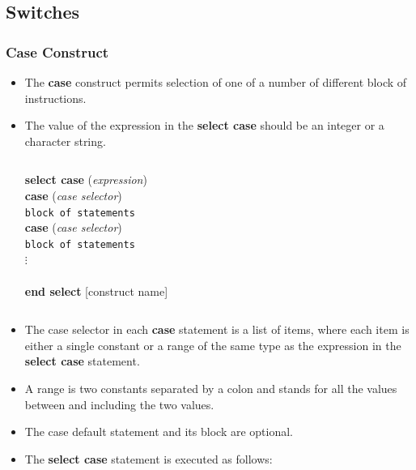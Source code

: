 \documentclass[slidestop,mathserif,compress,xcolor=svgnames]{beamer}
\begin{document}
\subsection{Switches}
\begin{frame}
  \frametitle{\small Case Construct}
  \begin{itemize}
    \item The \textbf{case} construct permits selection of one of a number of different block of instructions.
    \item The value of the expression in the \textbf{select case} should be an integer or a character string.
  \begin{columns}
    \column{5cm}
    \begin{block}{}
      \begin{tabbing}
        [co\=nstruct name:] \textbf{select case} (\textit{expression})\\
        \> \textbf{ca}\=\textbf{se} (\textit{case selector})\\
        \> \> \texttt{block of statements}\\
        \> \textbf{case} (\textit{case selector})\\
        \> \> \texttt{block of statements}\\
        \> \> $\vdots$ \\
        \\
        \textbf{end select} [construct name]
      \end{tabbing}
    \end{block}
  \end{columns}
    \item The case selector in each \textbf{case} statement is a list of items, where each item is either a single constant or a range of the same type as the expression in the \textbf{select case} statement.
    \item A range is two constants separated by a colon and stands for all the values between and including the two values. 
    \item The case default statement and its block are optional.
  \end{itemize}
  \framebreak
  \begin{itemize}
    \item The \textbf{select case} statement is executed as follows:
    \begin{enumerate}

\end{enumerate}
\end{itemize}
\end{frame}
\end{document}
